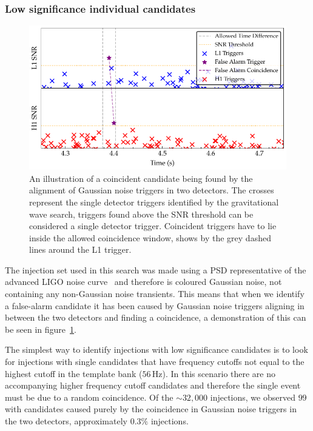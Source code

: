 \subsubsection{\label{6:sec:low-significance-cands}Low significance individual candidates}
%
\begin{figure}
       \centering
    \includegraphics[width=\textwidth]{images/6_earlywarning/identified-problems/low_sig_cands.pdf}
    \caption{An illustration of a coincident candidate being found by the alignment of Gaussian noise triggers in two detectors. The crosses represent the single detector triggers identified by the gravitational wave search, triggers found above the SNR threshold can be considered a single detector trigger. Coincident triggers have to lie inside the allowed coincidence window, shows by the grey dashed lines around the L1 trigger.}
    \label{6:fig:low_significance_candidates}
\end{figure}
%
The injection set used in this search was made using a PSD representative of the advanced LIGO noise curve~\cite{aLIGO_design_curve:2018} and therefore is coloured Gaussian noise, not containing any non-Gaussian noise transients. This means that when we identify a false-alarm candidate it has been caused by Gaussian noise triggers aligning in between the two detectors and finding a coincidence, a demonstration of this can be seen in figure~\ref{6:fig:low_significance_candidates}.

The simplest way to identify injections with low significance candidates is to look for injections with single candidates that have frequency cutoffs not equal to the highest cutoff in the template bank ($56 \, \text{Hz}$). In this scenario there are no accompanying higher frequency cutoff candidates and therefore the single event must be due to a random coincidence. Of the ${\sim}32,000$ injections, we observed $99$ with candidates caused purely by the coincidence in Gaussian noise triggers in the two detectors, approximately $0.3\%$ injections.

